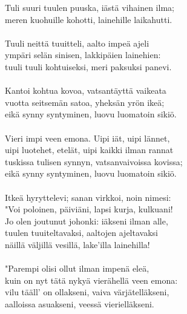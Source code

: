 Tuli suuri tuulen puuska, iästä vihainen ilma;              \\
meren kuohuille kohotti, lainehille laikahutti.             \\
                                                            \\
Tuuli neittä tuuitteli, aalto impeä ajeli                   \\
ympäri selän sinisen, lakkipäien lainehien:                 \\
tuuli tuuli kohtuiseksi, meri paksuksi panevi.              \\
                                                            \\
Kantoi kohtua kovoa, vatsantäyttä vaikeata                  \\
vuotta seitsemän satoa, yheksän yrön ikeä;                  \\
eikä synny syntyminen, luovu luomatoin sikiö.               \\
                                                            \\
Vieri impi veen emona. Uipi iät, uipi lännet,               \\
uipi luotehet, etelät, uipi kaikki ilman rannat             \\
tuskissa tulisen synnyn, vatsanvaivoissa kovissa;           \\
eikä synny syntyminen, luovu luomatoin sikiö.               \\
                                                            \\
Itkeä hyryttelevi; sanan virkkoi, noin nimesi:              \\
"Voi poloinen, päiviäni, lapsi kurja, kulkuani!             \\
Jo olen joutunut johonki: iäkseni ilman alle,               \\
tuulen tuuiteltavaksi, aaltojen ajeltavaksi                 \\
näillä väljillä vesillä, lake'illa lainehilla!              \\
                                                            \\
"Parempi olisi ollut ilman impenä eleä,                     \\
kuin on nyt tätä nykyä vierähellä veen emona:               \\
vilu tääll' on ollakseni, vaiva värjätelläkseni,            \\
aalloissa asuakseni, veessä vierielläkseni.                 \\
